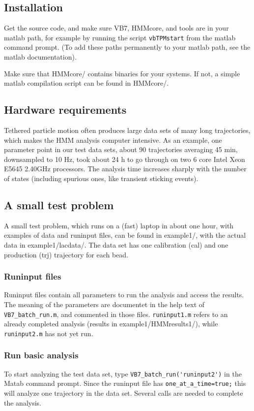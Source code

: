 \subsection{Installation}
Get the source code, and make sure VB7, HMMcore, and tools are in your
matlab path, for example by running the script \verb+vbTPMstart+ from
the matlab command prompt. (To add these paths permanently to your
matlab path, see the matlab documentation).

Make sure that HMMcore/ contains binaries for your systems. If not, a
simple matlab compilation script can be found in HMMcore/.

\subsection{Hardware requirements}
Tethered particle motion often produces large data sets of many long
trajectories, which makes the HMM analysis computer intensive. As an
example, one parameter point in our test data sets, about 90
trajectories averaging 45 min, downsampled to 10 Hz, took about 24 h
to go through on two 6 core Intel Xeon E5645 2.40GHz processors. The
analysis time increases sharply with the number of states (including
spurious ones, like transient sticking events).
\subsection{A small test problem}
A small test problem, which runs on a (fast) laptop in about one hour,
with examples of data and runinput files, can be found in example1/,
with the actual data in example1/lacdata/.  The data set has one
calibration (cal) and one production (trj) trajectory for each bead.

\subsubsection*{Runinput files} 
Runinput files contain all parameters to run the analysis and access
the results. The meaning of the parameters are documentet in the help
text of \verb+VB7_batch_run.m+, and commented in those files.
\verb+runinput1.m+ refers to an already completed analysis (results in
example1/HMMresults1/), while \verb+runinput2.m+ has not yet run.

\subsubsection*{Run basic analysis}
To start analyzing the test data set, type
\verb+VB7_batch_run('runinput2')+ in the Matab command prompt. Since
the runinput file has \verb+one_at_a_time=true;+ this will analyze one
trajectory in the data set. Several calls are needed to complete the
analysis. 

